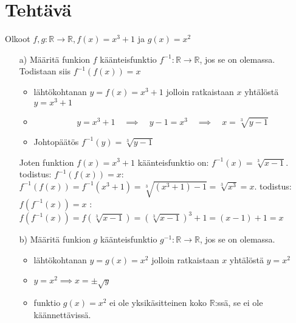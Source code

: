 \documentclass{article}
\newcounter{tehtava}
\begin{document}
    \newpage
    \section*{Tehtävä \thetehtava}
    Olkoot $f, g: \mathbb{R} \rightarrow \mathbb{R}, f(x) = x^3 + 1$ ja $g(x) = x^2$
    \begin{itemize}
        \item[a)] Määritä funkion $f$ käänteisfunktio $f^{-1}:\mathbb{R} \rightarrow \mathbb{R}$, jos se on olemassa.\newline
        Todistaan siis $f^{-1} (f(x)) = x$
        \begin{itemize}
            \item lähtökohtanan $y = f(x) = x^3 + 1$ jolloin ratkaistaan $x$ yhtälöstä $y = x^3 + 1$
            \item \[y = x^3 + 1 \quad \implies \quad y - 1 = x^3 \quad \implies \quad x = \sqrt[3]{y - 1} \]
            \item Johtopäätös $f^{-1}(y) = \sqrt[3]{y - 1}$
        \end{itemize}
        Joten funktion $f(x) = x^3 + 1$ käänteisfunktio on: $f^{-1}(x) = \sqrt[3]{x - 1}$. todistus: $f^{-1}(f(x)) = x$: \newline
        $f^{-1}(f(x)) = f^{-1}(x^3 + 1) = \sqrt[3]{(x^3 + 1) - 1} = \sqrt[3]{x^3} = x$. todistus: $f(f^{-1}(x)) = x$ :\newline
        $f(f^{-1}(x)) = f\left(\sqrt[3]{x - 1}\right) = \left(\sqrt[3]{x - 1}\right)^3 + 1 = (x - 1) + 1 = x$
        \item[b)] Määritä funkion $g$ käänteisfunktio $g^{-1}:\mathbb{R} \rightarrow \mathbb{R}$, jos se on olemassa.
        \begin{itemize}
            \item lähtökohtanan $y = g(x) = x^2$ jolloin ratkaistaan $x$ yhtälöstä $y = x^2$
            \item $y = x^2 \implies x = \pm \sqrt{y}$
            \item funktio $g(x) = x^2$ ei ole yksikäsitteinen koko $\mathbb{R}$:ssä, se ei ole käännettävissä.
        \end{itemize}
    \end{itemize}

    \newpage
\end{document}
